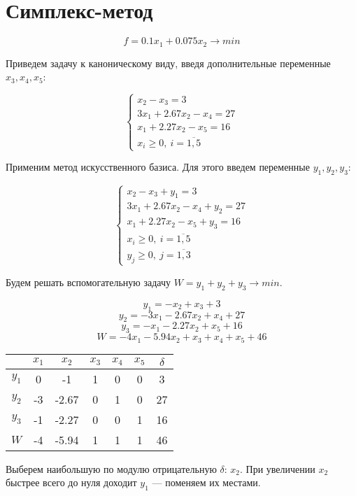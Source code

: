 \documentclass[listings]{labreport}
\begin{document}
\maketitlepage

\section*{Симплекс-метод}

$$f = 0.1x_1 + 0.075x_2 \to min$$

Приведем задачу к каноническому виду, введя дополнительные переменные $x_3, x_4, x_5$:

$$
\begin{cases}
  x_2 - x_3 = 3 \\
  3x_1 + 2.67x_2 - x_4 = 27 \\
  x_1 + 2.27x_2 - x_5 = 16 \\
  x_i \geqslant 0,\ i = \overline{1,5}
\end{cases}
$$

Применим метод искусственного базиса. Для этого введем переменные $y_1, y_2, y_3$:

$$
\begin{cases}
  x_2 - x_3 + y_1 = 3 \\
  3x_1 + 2.67x_2 - x_4 + y_2 = 27 \\
  x_1 + 2.27x_2 - x_5 + y_3 = 16 \\
  x_i \geqslant 0,\ i = \overline{1,5} \\
  y_j \geqslant 0,\ j = \overline{1,3}
\end{cases}
$$

Будем решать вспомогательную задачу $W = y_1 + y_2 + y_3 \to min$.

$$y_1 = -x_2 + x_3 + 3$$
$$y_2 = -3 x_1 - 2.67 x_2 + x_4 + 27$$
$$y_3 = -x_1 - 2.27 x_2 + x_5 + 16$$
$$W = -4 x_1 - 5.94 x_2 + x_3 + x_4 + x_5 + 46$$

\begin{center}
\begin{tabular}{c|cccccc}
& $x_1$ & $x_2$ & $x_3$ & $x_4$ & $x_5$ & $\delta$ \\\hline
$y_1$ & 0 & -1 & 1 & 0 & 0 & 3 \\
$y_2$ & -3 & -2.67 & 0 & 1 & 0 & 27 \\
$y_3$ & -1 & -2.27 & 0 & 0 & 1 & 16 \\\hline
$W$ & -4 & -5.94 & 1 & 1 & 1 & 46 \\
\end{tabular}
\end{center}

Выберем наибольшую по модулю отрицательную $\delta$: $x_2$. При увеличении $x_2$
быстрее всего до нуля доходит $y_1$ — поменяем их местами.
\end{document}
